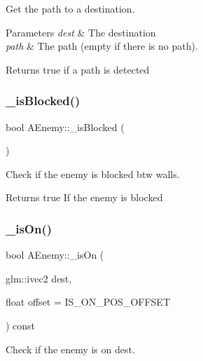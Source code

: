 Get the path to a destination. 


\begin{DoxyParams}{Parameters}
{\em dest} & The destination \\
\hline
{\em path} & The path (empty if there is no path). \\
\hline
\end{DoxyParams}
\begin{DoxyReturn}{Returns}
true if a path is detected 
\end{DoxyReturn}
\mbox{\label{class_a_enemy_a4348865dc5c245e2d88e31296847e1a6}} 
\subsubsection{\texorpdfstring{\+\_\+is\+Blocked()}{\_isBlocked()}}
{\footnotesize\ttfamily bool A\+Enemy\+::\+\_\+is\+Blocked (\begin{DoxyParamCaption}{ }\end{DoxyParamCaption})\hspace{0.3cm}{\ttfamily [protected]}}



Check if the enemy is blocked btw walls. 

\begin{DoxyReturn}{Returns}
true If the enemy is blocked 
\end{DoxyReturn}
\mbox{\label{class_a_enemy_a250a33c7294ac9d6b125eebe8acd51e3}} 
\subsubsection{\texorpdfstring{\+\_\+is\+On()}{\_isOn()}}
{\footnotesize\ttfamily bool A\+Enemy\+::\+\_\+is\+On (\begin{DoxyParamCaption}\item[{glm\+::ivec2}]{dest,  }\item[{float}]{offset = {\ttfamily IS\+\_\+ON\+\_\+POS\+\_\+OFFSET} }\end{DoxyParamCaption}) const\hspace{0.3cm}{\ttfamily [protected]}}



Check if the enemy is on dest. 


